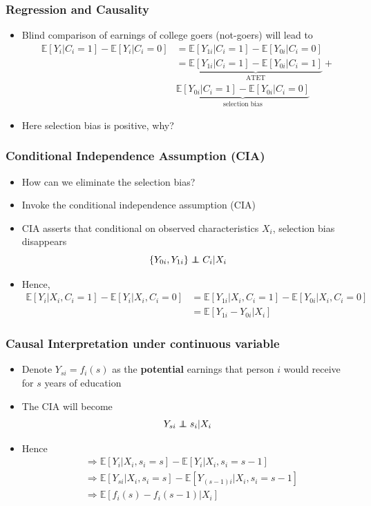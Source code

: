 \documentclass{beamer}
\theoremstyle{plain}
\newcommand\independent{\protect\mathpalette{\protect\independenT}{\perp}}
\def\independenT#1#2{\mathrel{\rlap{$#1#2$}\mkern2mu{#1#2}}}
\begin{document}
\begin{frame}
\frametitle{Regression and Causality}
\begin{itemize}
	\item Blind comparison of earnings of college goers (not-goers) will lead to 
	\begin{align*}
			\mathbb E[Y_i | C_i = 1] - \mathbb E[Y_i | C_i = 0] &= \mathbb E[Y_{1i} | C_i = 1] - \mathbb E[Y_{0i} | C_i = 0]\\
			&= \underbrace{\mathbb E[Y_{1i} | C_i = 1] - \mathbb E[Y_{0i} | C_i = 1]}_{\text{ATET}} +\\
			& \underbrace{\mathbb E[Y_{0i} | C_i = 1] - \mathbb E[Y_{0i} | C_i = 0]}_{\text{selection bias}}
		\end{align*}
	\item Here selection bias is positive, why?
\end{itemize}
\end{frame}

\begin{frame}
\frametitle{Conditional Independence Assumption (CIA)}
\begin{itemize}
	\item How can we eliminate the selection bias?
	\item Invoke the conditional independence assumption (CIA)
	\item CIA asserts that conditional on observed characteristics $X_i$, selection bias disappears
		$$\{Y_{0i}, Y_{1i}\} \independent C_i \rvert X_i  $$
	\item Hence, 
	\small
		\begin{align*}
				\mathbb E[Y_i | X_i, C_i = 1] - \mathbb E[Y_i | X_i, C_i = 0] &= \mathbb E[Y_{1i} | X_i, C_i = 1] - \mathbb E[Y_{0i} | X_i, C_i = 0]\\
				&= \mathbb E[Y_{1i} - Y_{0i} | X_i]
			\end{align*}
\end{itemize}
\end{frame}


\begin{frame}
\frametitle{Causal Interpretation under continuous variable}
\begin{itemize}
	\item Denote $Y_{si} = f_i(s)$ as the \textbf{potential} earnings that person $i$ would receive for $s$ years of education
	\item The CIA will become 
	$$ Y_{si} \independent s_i \rvert X_i $$
	\item Hence 
	\begin{align*}
		&\Rightarrow \mathbb E[Y_{i} | X_i, s_i = s] - \mathbb E[Y_{i} | X_i, s_i = s-1]\\
		 &\Rightarrow \mathbb E[Y_{si} | X_i, s_i = s] - \mathbb E[Y_{(s-1)i} | X_i, s_i = s-1]\\
		 &\Rightarrow \mathbb E[f_i(s) - f_i(s-1) | X_i]
		\end{align*}
\end{itemize}
\end{frame}
\end{document}
